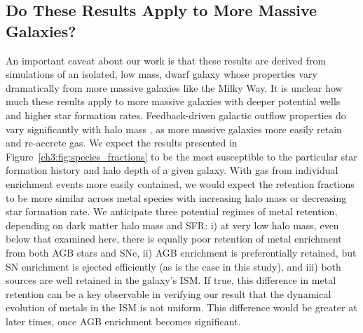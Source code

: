\subsection{Do These Results Apply to More Massive Galaxies?}
\label{ch3:sec:massive galaxies}
An important caveat about our work is that these results are derived from simulations of an isolated, low mass, dwarf galaxy whose properties vary dramatically from more massive galaxies like the Milky Way. It is unclear how much these results apply to more massive galaxies with deeper potential wells and higher star formation rates. Feedback-driven galactic outflow properties do vary significantly with halo mass \citep[e.g.][]{MacLowFerrara1999,Muratov2017}, as more massive galaxies more easily retain and re-accrete gas. We expect the results presented in Figure~\ref{ch3:fig:species_fractions} to be the most susceptible to the particular star formation history and halo depth of a given galaxy. With gas from individual enrichment events more easily contained, we would expect the retention fractions to be more similar across metal species with increasing halo mass or decreasing star formation rate. We anticipate three potential regimes of metal retention, depending on dark matter halo mass and SFR: i) at very low halo mass, even below that examined here, there is equally poor retention of metal enrichment from both AGB stars and SNe, ii) AGB enrichment is preferentially retained, but SN enrichment is ejected efficiently (as is the case in this study), and iii) both sources are well retained in the galaxy's ISM. If true, this difference in metal retention can be a key observable in verifying our result that the dynamical evolution of metals in the ISM is not uniform.
This difference would be greater at later times, once AGB enrichment becomes significant.

